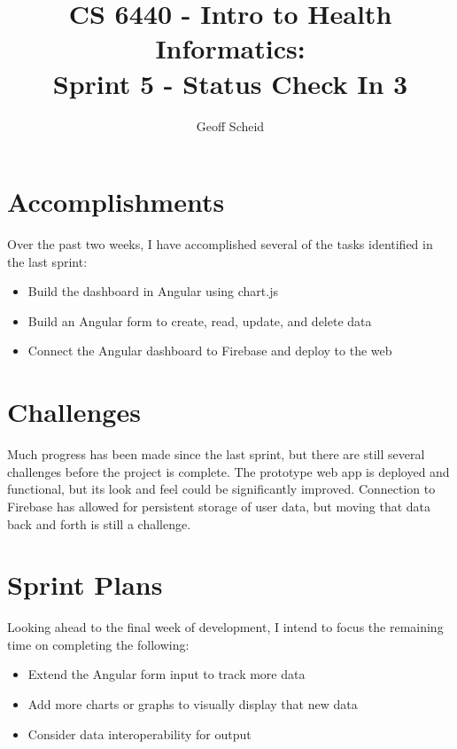 \documentclass[letterpaper]{jdf}
\author{Geoff Scheid}
\title{CS 6440 - Intro to Health Informatics:\\Sprint 5 - Status Check In 3}
\begin{document}
\maketitle

\section{Accomplishments}
Over the past two weeks, I have accomplished several of the tasks identified in the last sprint:
\begin{itemize}
    \item Build the dashboard in Angular using chart.js
    \item Build an Angular form to create, read, update, and delete data
    \item Connect the Angular dashboard to Firebase and deploy to the web
\end{itemize}

\section{Challenges}
Much progress has been made since the last sprint, but there are still several challenges before the project is complete.
The prototype web app is deployed and functional, but its look and feel could be significantly improved.
Connection to Firebase has allowed for persistent storage of user data, but moving that data back and forth is still a challenge.

\section{Sprint Plans}
Looking ahead to the final week of development, I intend to focus the remaining time on completing the following:
\begin{itemize}
    \item Extend the Angular form input to track more data
    \item Add more charts or graphs to visually display that new data
    \item Consider data interoperability for output
\end{itemize}
\end{document}

